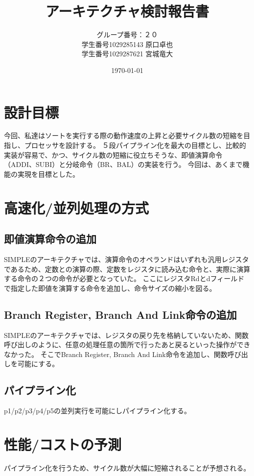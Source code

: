 \documentclass{jsreport}
\title{アーキテクチャ検討報告書}
\author{グループ番号：２０　\\学生番号1029285143 原口卓也
\\学生番号1029287621 宮城竜大}
\date{\today}
\begin{document}
\begin{titlepage}
\maketitle
\end{titlepage} 
\clearpage 
\section{設計目標} 
今回、私達はソートを実行する際の動作速度の上昇と必要サイクル数の短縮を目指し、プロセッサを設計する。
５段パイプライン化を最大の目標とし、比較的実装が容易で、かつ、サイクル数の短縮に役立ちそうな、即値演算命令（ADDI、SUBI）と分岐命令（BR、BAL）の実装を行う。
今回は、あくまで機能の実現を目標とした。


\section{高速化/並列処理の方式}
\subsection{即値演算命令の追加}       
SIMPLEのアーキテクチャでは、演算命令のオペランドはいずれも汎用レジスタであるため、定数との演算の際、定数をレジスタに読み込む命令と、実際に演算する命令の２つの命令が必要となっていた。
ここにレジスタRdとdフィールドで指定した即値を演算する命令を追加し、命令サイズの縮小を図る。    
\subsection{Branch Register, Branch And Link命令の追加}    
SIMPLEのアーキテクチャでは、レジスタの戻り先を格納していないため、関数呼び出しのように、任意の処理任意の箇所で行ったあと戻るといった操作ができなかった。
そこでBranch Register, Branch And Link命令を追加し、関数呼び出しを可能にする。        
\subsection{パイプライン化}     	
p1/p2/p3/p4/p5の並列実行を可能にしパイプライン化する。 

\section{性能/コストの予測} 
パイプライン化を行うため、サイクル数が大幅に短縮されることが予想される。
\end{document}
